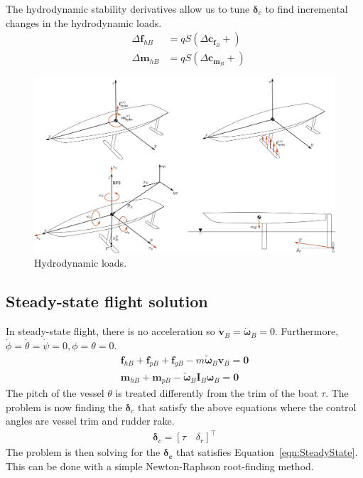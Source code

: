 \documentclass[10pt]{article}
\newcommand{\mbf}[1]{\mathbf{#1}}
\newcommand{\be}{\begin{eqnarray}}
\newcommand{\ee}{\end{eqnarray}}
\begin{document}
The hydrodynamic stability derivatives allow us to tune $\boldsymbol{\delta}_c$ to find incremental changes in the hydrodynamic loads.
\be
& \Delta \mbf{f}_{h B} & = q S \left( \Delta \mbf{c}_{\mbf{f}_B} + \right)
\\
& \Delta \mbf{m}_{h B} & = q S \left( \Delta \mbf{c}_{\mbf{m}_B} + \right)
\ee
% 
\begin{figure}[htb!]
    \centering
    \includegraphics[width=\linewidth,clip,trim={0cm 22cm 0cm 0cm}]{SeakeepingDiagram.pdf}
    \caption{\label{fig:HydroLoads}
        Hydrodynamic loads.
    }
\end{figure}

\subsection{Steady-state flight solution}
% 
In steady-state flight, there is no acceleration so $\dot{\mbf{v}}_B=\dot{\boldsymbol{\omega}}_B=0$.
Furthermore, $\dot{\phi}=\dot{\theta}=\dot{\psi} = 0, \phi=\theta=0$.
\be
\label{eqn:SteadyState}
\boxed{
    \mbf{f}_{h B} + \mbf{f}_{p B} + \mbf{f}_{g B} - m \tilde{\boldsymbol{\omega}}_B \mbf{v}_B= \mbf{0}
}
\\
\boxed{\mbf{m}_{h B} + \mbf{m}_{p B} - \tilde{\boldsymbol{\omega}}_B \mbf{I}_B \boldsymbol{\omega}_B = \mbf{0}
}
\ee
The pitch of the vessel $\theta$ is treated differently from the trim of the boat $\tau$.
The problem is now finding the $\boldsymbol{\delta}_c$ that satisfy the above equations where the control angles are vessel trim and rudder rake.
\be
\boldsymbol{\delta}_c = \left[
    \tau \quad \delta_r
    \right]^{\top}
\ee
The problem is then solving for the $\boldsymbol{\delta_c}$ that satisfies Equation~\eqref{eqn:SteadyState}.
This can be done with a simple Newton-Raphson root-finding method.
\end{document}
